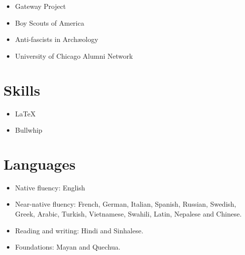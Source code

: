 \documentclass[%
    11pt,
  oneside
  ]{memoir}
\begin{document}
\begin{adjustwidth*}{9em}{0em}
\begin{itemize}
\tightlist
\item
  Gateway Project
\item
  Boy Scouts of America
\item
  Anti-fascists in Archæology
\item
  University of Chicago Alumni Network
\end{itemize}

\hypertarget{skills}{%
\section{Skills}\label{skills}}

\begin{itemize}
\tightlist
\item
  \LaTeX
\item
  Bullwhip
\end{itemize}

\hypertarget{languages}{%
\section{Languages}\label{languages}}

\begin{itemize}
\tightlist
\item
  Native fluency: English
\item
  Near-native fluency: French, German, Italian, Spanish, Russian,
  Swedish, Greek, Arabic, Turkish, Vietnamese, Swahili, Latin, Nepalese
  and Chinese.
\item
  Reading and writing: Hindi and Sinhalese.
\item
  Foundations: Mayan and Quechua.
\end{itemize}
  \end{adjustwidth*}
\end{document}
